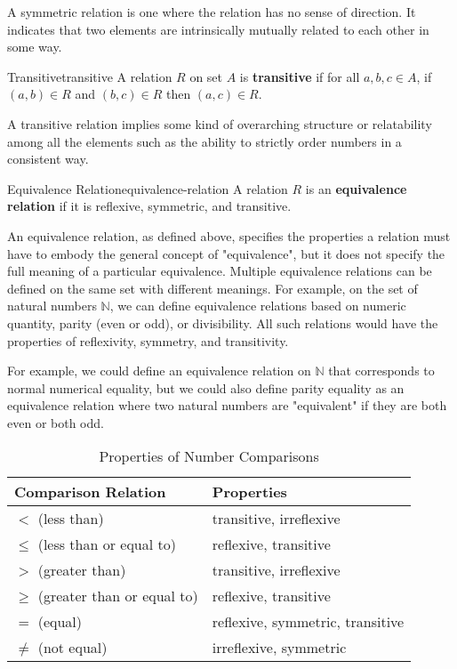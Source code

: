 A symmetric relation is one where the relation has no sense of direction. It indicates that two elements are
intrinsically mutually related to each other in some way.

\begin{definition}{Transitive}{transitive}
  A relation \( R \) on set \( A \) is \textbf{transitive} if for all \( a, b, c \in A \), if \( (a, b) \in R \) and
  \( (b, c) \in R \) then \( (a, c) \in R \).
\end{definition}

A transitive relation implies some kind of overarching structure or relatability among all the elements
such as the ability to strictly order numbers in a consistent way.

\begin{definition}{Equivalence Relation}{equivalence-relation}
  A relation \( R \) is an \textbf{equivalence relation} if it is reflexive, symmetric, and transitive.
\end{definition}

An equivalence relation, as defined above, specifies the properties a relation must have to embody
the general concept of "equivalence", but it does not specify the full meaning of a particular
equivalence. Multiple equivalence relations can be defined on the same set with different meanings.
For example, on the set of natural numbers \( \mathbb{N} \), we can define equivalence relations based
on numeric quantity, parity (even or odd), or divisibility. All such relations would have the properties
of reflexivity, symmetry, and transitivity.

For example, we could define an equivalence relation on \( \mathbb{N} \) that corresponds
to normal numerical equality, but we could also define parity equality as an equivalence relation where two
natural numbers are "equivalent" if they are both even or both odd.

\begin{table}[H]
  \centering
  \begin{tabular}{p{2in} p{3in}}
  \toprule
  \textbf{Comparison Relation} & \textbf{Properties} \\
  \midrule
  \( < \) (less than) & transitive, irreflexive \\
  \( \leq \) (less than or equal to) & reflexive, transitive \\
  \( > \) (greater than) & transitive, irreflexive \\
  \( \geq \) (greater than or equal to) & reflexive, transitive \\
  \( = \) (equal) & reflexive, symmetric, transitive \\
  \( \neq \) (not equal) & irreflexive, symmetric \\
  \bottomrule
  \end{tabular}
  \caption{Properties of Number Comparisons}
\end{table}

